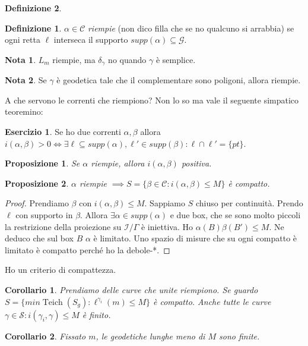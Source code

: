 \documentclass[a4paper]{article}
\newtheorem{proposition}{Proposizione}
\newtheorem{corollary}{Corollario}
\theoremstyle{definition}
\newtheorem{definition}{Definizione}
\newtheorem{exercise}{Esercizio}
\newtheorem{remark}{Nota}
\DeclareMathOperator{\Teich}{Teich}
\begin{document}
\begin{definition}
    \begin{definition}
        $\alpha \in \mathcal C$ \emph{riempie} (non dico filla che se no qualcuno si arrabbia) se ogni retta $\ell$ interseca il supporto $supp(\alpha) \subseteq \mathcal G$. 
    \end{definition}
    
    \begin{remark}
        $L_{m}$ riempie, ma $\delta_\gamma$ no quando $\gamma$ è semplice.
    \end{remark}

    \begin{remark}
        Se $\gamma$ è geodetica tale che il complementare sono poligoni, allora riempie.
    \end{remark}

    A che servono le correnti che riempiono? Non lo so ma vale il seguente simpatico teoremino:
    \begin{exercise}
        Se ho due correnti $\alpha, \beta$ allora $i(\alpha,\beta)>0 \iff \exists \ell \subseteq supp(\alpha), \ell' \in supp(\beta): \ell \cap \ell' =\{pt\}$.
    \end{exercise}

    \begin{proposition}
        Se $\alpha$ riempie, allora $i(\alpha, \beta)$ positiva.
    \end{proposition}

    \begin{proposition}
        $\alpha$ riempie $\implies S = \{\beta \in \mathcal C: i(\alpha,\beta) \leq M\}$ è compatto.
    \end{proposition}

    \begin{proof}
        Prendiamo $\beta$ con $i(\alpha,\beta) \leq M$. Sappiamo $S$ chiuso per continuità. Prendo $\ell$ con supporto in $\beta$. Allora $\exists \alpha \in supp(\alpha)$ e due box, che se sono molto piccoli la restrizione della proiezione su $\mathcal I / \Gamma$ è iniettiva.
        Ho $\alpha(B)\beta(B')\leq M$. Ne deduco che sul box $B$ $\alpha$ è limitato. Uno spazio di misure che su ogni compatto è limitato è compatto perché ho la debole-*.
    \end{proof}

    Ho un criterio di compattezza.
    \begin{corollary}
        Prendiamo delle curve che unite riempiono. Se guardo $S = \{m in \Teich(S_g): \ell^{\gamma_i} (m) \leq M\}$ è compatto.
        Anche tutte le curve $\gamma \in \mathcal S: i(\gamma_i,\gamma) \leq M$ è finito.
    \end{corollary}
    
    \begin{corollary}
        Fissato $m$, le geodetiche lunghe meno di $M$ sono finite.
    \end{corollary}
    
\end{definition}
\end{document}

